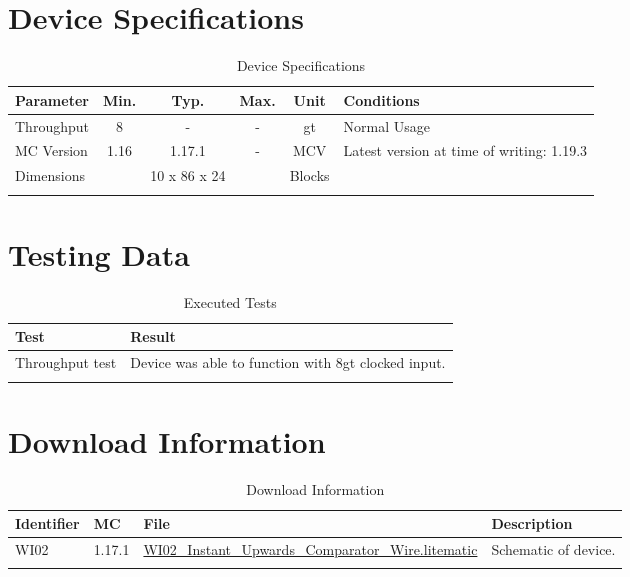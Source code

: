 \documentclass[10pt]{datasheet}
\begin{document}
\onecolumn

\section{Device Specifications}

\begin{table}[h]
    \caption{Device Specifications}
    \begin{tabularx}{\textwidth}{l | c c c | c | X}
        \thickhline
        \textbf{Parameter} & \textbf{Min.} & \textbf{Typ.} & \textbf{Max.} &
        \textbf{Unit} & \textbf{Conditions} \\
        \hline
        Throughput  & 8 & - & - & gt & Normal Usage \\
        \hline
        MC Version & 1.16 & 1.17.1 & - & MCV & Latest version at time of writing: 1.19.3\\
        \hline
        Dimensions & & 10 x 86 x 24 & & Blocks & \\
        \thickhline
\end{tabularx}
\end{table}

\section{Testing Data}
\begin{table}[h]
\caption{Executed Tests}
\begin{tabularx}{\textwidth}{l | X}
    \thickhline
    \textbf{Test} & \textbf{Result} \\
    \hline
    Throughput test & Device was able to function with 8gt clocked input. \\
    \thickhline
\end{tabularx}
\end{table}

\section{Download Information}
\begin{table}[h]
    \caption{Download Information}
    \begin{tabularx}{\textwidth}{l | l | l | X}
        \thickhline
        \textbf{Identifier} & \textbf{MC} & \textbf{File} & \textbf{Description} \\
        \hline
        WI02 & 1.17.1 & \href{https://github.com/Soontech-Annals/Archive/blob/8413f90a054b6c415703bae02badeba7541344f6/Archive/wiring/WI02\%20Instant\%20Upwards\%20Comparator\%20Wire/WI02\_Instant\_Upwards\_Comparator\_Wire.litematic?raw=1}{WI02\_Instant\_Upwards\_Comparator\_Wire.litematic} & Schematic of device. \\
        \hline
        \thickhline
    \end{tabularx}
\end{table}
\end{document}
